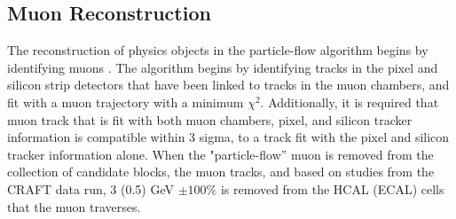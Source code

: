\subsection{Muon Reconstruction}
\label{muon_reco_overview}

\par The reconstruction of physics objects in the particle-flow
algorithm begins by identifying muons \cite{CMS-PAS-PFT-09-001}.  The
algorithm begins by identifying tracks in the pixel and silicon strip
detectors that have been linked to tracks in the muon chambers, and
fit with a muon trajectory with a minimum $\chi^{2}$.  Additionally, it
is required that muon track that is fit with both muon chambers,
pixel, and silicon tracker information is compatible within 3 sigma,
to a track fit with the pixel and silicon tracker information alone.
When the "particle-flow'' muon is removed from the collection of
candidate blocks, the muon tracks, and based on studies from the CRAFT
data run, 3 (0.5) GeV $\pm 100\%$ is removed from the HCAL (ECAL)
cells that the muon traverses.  

